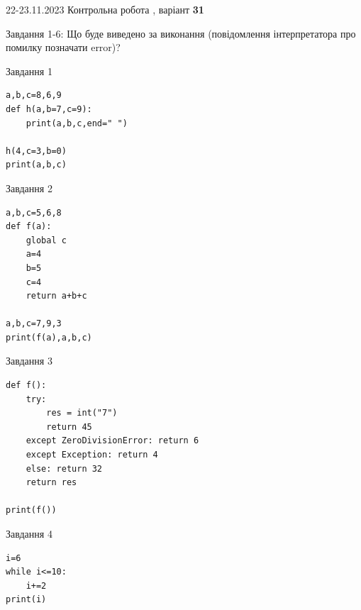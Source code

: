 \documentclass[12pt, ukrainian]{article}
\begin{document}
{{22-23.11.2023 Контрольна робота , варіант  \No \textbf { 31 }\par}}
{

Завдання 1-6: Що буде виведено за виконання (повідомлення інтерпретатора про помилку позначати error)?


\begin{minipage}[t]{9.7cm}                
{\begin{center}Завдання {1}\end{center}}
\begin{verbatim}
a,b,c=8,6,9
def h(a,b=7,c=9):
    print(a,b,c,end=" ")

h(4,c=3,b=0)
print(a,b,c)
\end{verbatim}     
\end{minipage}
\vline \hspace{8mm}
\begin{minipage}[t]{8.0cm}                
{\begin{center}Завдання {2}\end{center}}
\begin{verbatim}
a,b,c=5,6,8
def f(a):
    global c
    a=4
    b=5
    c=4
    return a+b+c

a,b,c=7,9,3
print(f(a),a,b,c)
\end{verbatim}     
\end{minipage}

\vspace{15mm}
\begin{minipage}[t]{9.7cm}                
{\begin{center}Завдання {3}\end{center}}
\begin{verbatim}
def f():
    try:
        res = int("7")
        return 45
    except ZeroDivisionError: return 6
    except Exception: return 4
    else: return 32
    return res

print(f())
\end{verbatim}     
\end{minipage}
\vline \hspace{8mm}
\begin{minipage}[t]{8.0cm}                
{\begin{center}Завдання {4}\end{center}}
\begin{verbatim}
i=6
while i<=10:
    i+=2
print(i)
\end{verbatim}     
\end{minipage}

}
\end{document}
